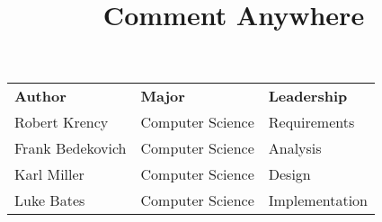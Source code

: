 \documentclass[14pt]{article}
\title{\vspace{2cm} \Huge Comment Anywhere}
\author{}
\date{}
\begin{document}
    
\maketitle
\thispagestyle{fancy}

\vspace{12cm}

\begin{center}
    \begin{tabular}{l l l}
        \textbf{Author} & \textbf{Major} & \textbf{Leadership}\\
        Robert Krency & Computer Science & Requirements\\
        Frank Bedekovich \hspace{1cm} & Computer Science \hspace{1cm} & Analysis \\
        Karl Miller & Computer Science & Design \\
        Luke Bates & Computer Science & Implementation
    \end{tabular}    
\end{center}


\pagebreak






\end{document}

